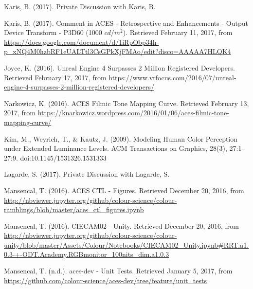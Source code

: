 \documentclass[conference]{IEEEtran}
\begin{document}
\begin{thebibliography}{1}
\renewcommand\@biblabel[1]{[KaA17]}
\bibitem{}
Karis, B. (2017). Private Discussion with Karis, B. \vspace{2mm}

\renewcommand\@biblabel[1]{[KaB17]}
\bibitem{}
Karis, B. (2017). Comment in ACES - Retrospective and Enhancements - Output Device Transform - P3D60 (1000 $cd/m^2$). Retrieved February 11, 2017, from \url{https://docs.google.com/document/d/1iRpObp34h-p_xNQ4M0hzbRF1eUALTtl3CsGPkXjFMAo/edit?disco=AAAAA7HLQK4} \vspace{2mm}

\renewcommand\@biblabel[1]{[Kev16]}
\bibitem{}
Joyce, K. (2016). Unreal Engine 4 Surpasses 2 Million Registered Developers. Retrieved February 17, 2017, from \url{https://www.vrfocus.com/2016/07/unreal-engine-4-surpasses-2-million-registered-developers/} \vspace{2mm}

\renewcommand\@biblabel[1]{[Nar16]}
\bibitem{}
Narkowicz, K. (2016). ACES Filmic Tone Mapping Curve. Retrieved February 13, 2017, from \url{https://knarkowicz.wordpress.com/2016/01/06/aces-filmic-tone-mapping-curve/} \vspace{2mm}

\renewcommand\@biblabel[1]{[KWK09]}
\bibitem{}
Kim, M., Weyrich, T., \& Kautz, J. (2009). Modeling Human Color Perception under Extended Luminance Levels. ACM Transactions on Graphics, 28(3), 27:1--27:9. doi:10.1145/1531326.1531333 \vspace{2mm}

\renewcommand\@biblabel[1]{[Lag17}
\bibitem{}
Lagarde, S. (2017). Private Discussion with Lagarde, S. \vspace{2mm}

\renewcommand\@biblabel[1]{[MaA16]}
\bibitem{}
Mansencal, T. (2016). ACES CTL - Figures. Retrieved December 20, 2016, from \url{http://nbviewer.jupyter.org/github/colour-science/colour-ramblings/blob/master/aces_ctl_figures.ipynb} \vspace{2mm}

\renewcommand\@biblabel[1]{[MaB16]}
\bibitem{}
Mansencal, T. (2016). CIECAM02 - Unity. Retrieved December 20, 2016, from \url{http://nbviewer.jupyter.org/github/colour-science/colour-unity/blob/master/Assets/Colour/Notebooks/CIECAM02_Unity.ipynb#RRT.a1.0.3-+-ODT.Academy.RGBmonitor_100nits_dim.a1.0.3} \vspace{2mm}

\renewcommand\@biblabel[1]{[Man17]}
\bibitem{}
Mansencal, T. (n.d.). aces-dev - Unit Tests. Retrieved January 5, 2017, from \url{https://github.com/colour-science/aces-dev/tree/feature/unit_tests}\\


\end{thebibliography}
\end{document}

